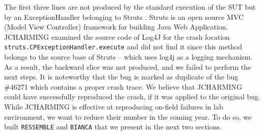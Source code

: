 \noindent{}

The first three lines are not produced by the standard
execution of the SUT but by an ExceptionHandler belonging
to Struts \cite{ApacheSoftwareFoundation2000}. Struts is an open source MVC (Model View
Controller) framework for building Java Web Application.
JCHARMING examined the source code of Log4J for the
crash location {\tt struts.CPExceptionHandler.execute} and did not
find it since this method belongs to the source base of Struts
-- which uses log4j as a logging mechanism. As a result, the
backward slice was not produced, and we failed to perform the
next steps. It is noteworthy that the bug is marked as duplicate
of the bug \#46271 which contains a proper crash trace. We
believe that JCHARMING could have successfully
reproduced the crash, if it was applied to the original bug. \\

While JCHARMING is effective at reproducing on-field failures in lab environment, we want to reduce their number in the coming year. To do so, we built {\tt RESSEMBLE} and {\tt BIANCA} that we present in the next two sections.
